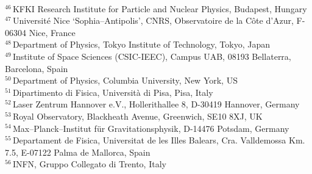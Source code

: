 {\\{$^{46}$\,KFKI Research Institute for Particle and Nuclear Physics, Budapest, Hungary}
\\{$^{47}$\,Universit\'{e} Nice \textquoteleft Sophia--Antipolis\textquoteright, CNRS, Observatoire de la C\^ote d'Azur, F-06304 Nice, France}
\\{$^{48}$\,Department of Physics, Tokyo Institute of Technology, Tokyo, Japan}
\\{$^{49}$\,Institute of Space Sciences (CSIC-IEEC), Campus UAB, 08193 Bellaterra, Barcelona, Spain}
\\{$^{50}$\,Department of Physics, Columbia University, New York, US}
\\{$^{51}$\,Dipartimento di Fisica, Universit\`{a} di Pisa, Pisa, Italy}
\\{$^{52}$\,Laser Zentrum Hannover e.V., Hollerithallee 8, D-30419 Hannover, Germany}
\\{$^{53}$\,Royal Observatory, Blackheath Avenue, Greenwich, SE10 8XJ, UK}
\\{$^{54}$\,Max--Planck--Institut f\"{u}r Gravitationsphysik, D-14476 Potsdam, Germany}
\\{$^{55}$\,Departament de Fisica, Universitat de les Illes Balears, Cra. 
Valldemossa Km. 7.5, E-07122 Palma de Mallorca, Spain}
\\{$^{56}$\,INFN, Gruppo Collegato di Trento, Italy}
}

%
